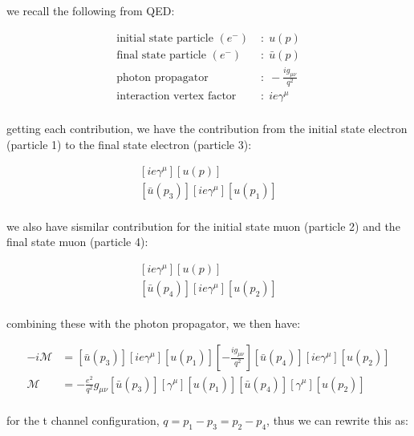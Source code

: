 \documentclass[11pt]{article}
\theoremstyle{definition}
\begin{document}
we recall the following from QED:

\begin{align*}
    \text{initial state particle }(e^{-}) \; &: \; u(p)\\
    \text{final state particle }(e^{-}) \; &: \; \bar{u}(p)\\
    \text{photon propagator }\; &: \; -\frac{ig_{\mu\nu}}{q^2}\\
    \text{interaction vertex factor } \; &: \; ie\gamma^{\mu}\\
\end{align*}


getting each contribution, we have the contribution from the initial state electron (particle 1) to the final state electron (particle 3):

\begin{align}
    [\bar{u}(p)]
    \left[ie\gamma^{\mu}\right]
    [u(p)]\\
    [\bar{u}(p_3)]
    \left[ie\gamma^{\mu}\right]
    [u(p_1)]\\
\end{align}

we also have sismilar contribution for the initial state muon (particle 2) and the final state muon (particle 4):


\begin{align}
    [\bar{u}(p)]
    \left[ie\gamma^{\mu}\right]
    [u(p)]\\
    [\bar{u}(p_4)]
    \left[ie\gamma^{\mu}\right]
    [u(p_2)]\\
\end{align}

combining these with the photon propagator, we then have:

\begin{align}
    -i\mathcal{M}
    &=
        [\bar{u}(p_3)]
        \left[ie\gamma^{\mu}\right]
        [u(p_1)]
    \left[
        -\frac{ig_{\mu\nu}}{q^2}
    \right]
        [\bar{u}(p_4)]
        \left[ie\gamma^{\mu}\right]
        [u(p_2)]\\
    \mathcal{M}
    &=
        -
        \frac{e^2}{q^2}
        g_{\mu\nu}
        [\bar{u}(p_3)]
        \left[\gamma^{\mu}\right]
        [u(p_1)]
        [\bar{u}(p_4)]
        \left[\gamma^{\mu}\right]
        [u(p_2)]\\
\end{align}

for the t channel configuration, $q = p_1-p_3 = p_2 - p_4$, thus we can rewrite this as:
\end{document}

